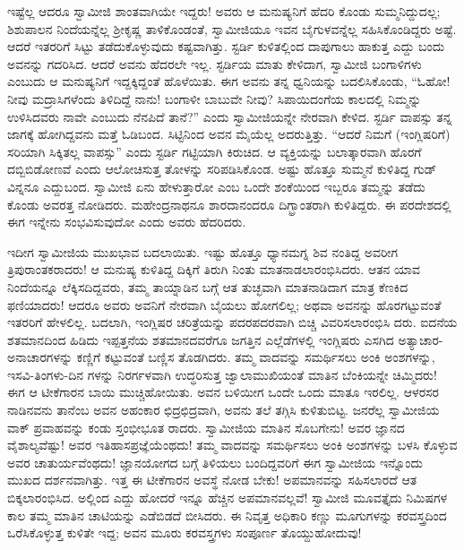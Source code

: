 ಇಷ್ಟೆಲ್ಲ ಆದರೂ ಸ್ವಾಮೀಜಿ ಶಾಂತವಾಗಿಯೇ ಇದ್ದರು! ಅವರು ಆ ಮನುಷ್ಯನಿಗೆ ಹೆದರಿ ಕೊಂಡು ಸುಮ್ಮನಿದ್ದುದಲ್ಲ; ಶಿಶುಪಾಲನ ನಿಂದೆಯನ್ನೆಲ್ಲ ಶ್ರೀಕೃಷ್ಣ ತಾಳಿಕೊಂಡಂತೆ, ಸ್ವಾಮೀಜಿಯೂ ಇವನ ಬೈಗುಳವನ್ನೆಲ್ಲ ಸಹಿಸಿಕೊಂಡಿದ್ದರು ಅಷ್ಟೆ. ಆದರೆ ಇತರರಿಗೆ ಸಿಟ್ಟು ತಡೆದುಕೊಳ್ಳುವುದು ಕಷ್ಟವಾಗಿತ್ತು. ಸ್ಟರ್ಡಿ ಕುಳಿತಲ್ಲಿಂದ ದಾಪುಗಾಲು ಹಾಕುತ್ತ ಎದ್ದು ಬಂದು ಅವನನ್ನು ಗದರಿಸಿದ. ಆದರೆ ಅವನು ಹೆದರಲೇ ಇಲ್ಲ. ಸ್ಟರ್ಡಿಯ ಮಾತು ಕೇಳಿದಾಗ, ಸ್ವಾಮೀಜಿ ಬಂಗಾಳಿಗಳು ಎಂಬುದು ಆ ಮನುಷ್ಯನಿಗೆ ಇದ್ದಕ್ಕಿದ್ದಂತೆ ಹೊಳೆಯಿತು. ಈಗ ಅವನು ತನ್ನ ಧ್ವನಿಯನ್ನು ಬದಲಿಸಿಕೊಂಡು, “ಓಹೋ! ನೀವು ಮದ್ರಾಸಿಗಳೆಂದು ತಿಳಿದಿದ್ದೆ ನಾನು! ಬಂಗಾಳೀ ಬಾಬುವೇ ನೀವು? ಸಿಪಾಯಿದಂಗೆಯ ಕಾಲದಲ್ಲಿ ನಿಮ್ಮನ್ನು ಉಳಿಸಿದವರು ನಾವೇ ಎಂಬುದು ನೆನಪಿದೆ ತಾನೆ?” ಎಂದು ಸ್ವಾಮೀಜಿಯನ್ನೇ ನೇರವಾಗಿ ಕೇಳಿದ. ಸ್ಟರ್ಡಿ ವಾಪಸ್ಸು ತನ್ನ ಜಾಗಕ್ಕೆ ಹೋಗಿದ್ದವನು ಮತ್ತೆ ಓಡಿಬಂದ. ಸಿಟ್ಟಿನಿಂದ ಅವನ ಮೈಯೆಲ್ಲ ಅದರುತ್ತಿತ್ತು. “ಆದರೆ ನಿಮಗೆ (ಇಂಗ್ಲಿಷರಿಗೆ) ಸರಿಯಾಗಿ ಸಿಕ್ಕಿತಲ್ಲ ವಾಪಸ್ಸು” ಎಂದು ಸ್ಟರ್ಡಿ ಗಟ್ಟಿಯಾಗಿ ಕಿರುಚಿದ. ಆ ವ್ಯಕ್ತಿಯನ್ನು ಬಲಾತ್ಕಾರವಾಗಿ ಹೊರಗೆ ದಬ್ಬಿಬಿಡೋಣವೆ ಎಂದು ಆಲೋಚಿಸುತ್ತ ತೋಳನ್ನು ಸರಿಪಡಿಸಿಕೊಂಡ. ಅಷ್ಟು ಹೊತ್ತೂ ಸುಮ್ಮನೆ ಕುಳಿತಿದ್ದ ಗುಡ್​ವಿನ್ನನೂ ಎದ್ದುಬಂದ. ಸ್ವಾಮೀಜಿ ಏನು ಹೇಳುತ್ತಾರೋ ಎಂಬ ಒಂದೇ ಶಂಕೆಯಿಂದ ಇಬ್ಬರೂ ತಮ್ಮನ್ನು ತಡೆದು ಕೊಂಡು ಅವರತ್ತ ನೋಡಿದರು. ಮಹೇಂದ್ರನಾಥನೂ ಶಾರದಾನಂದರೂ ದಿಗ್ಭ್ರಾಂತರಾಗಿ ಕುಳಿತಿದ್ದರು. ಈ ಪರದೇಶದಲ್ಲಿ ಈಗ ಇನ್ನೇನು ಸಂಭವಿಸುವುದೋ ಎಂದು ಅವರು ಹೆದರಿದರು.

ಇದೀಗ ಸ್ವಾಮೀಜಿಯ ಮುಖಭಾವ ಬದಲಾಯಿತು. ಇಷ್ಟು ಹೊತ್ತೂ ಧ್ಯಾನಮಗ್ನ ಶಿವ ನಂತಿದ್ದ ಅವರೀಗ ತ್ರಿಪುರಾಂತಕರಾದರು! ಆ ಮನುಷ್ಯ ಕುಳಿತಿದ್ದ ದಿಕ್ಕಿಗೆ ತಿರುಗಿ ನಿಂತು ಮಾತನಾಡಲಾರಂಭಿಸಿದರು. ಆತನ ಯಾವ ನಿಂದೆಯನ್ನೂ ಲೆಕ್ಕಿಸದಿದ್ದವರು, ತಮ್ಮ ತಾಯ್ನಾಡಿನ ಬಗ್ಗೆ ಆತ ತುಚ್ಛವಾಗಿ ಮಾತನಾಡಿದಾಗ ಮಾತ್ರ ಕೆಣಕಿದ ಫಣಿಯಾದರು! ಆದರೂ ಅವರು ಅವನಿಗೆ ನೇರವಾಗಿ ಬೈಯಲು ಹೋಗಲಿಲ್ಲ; ಅಥವಾ ಅವನನ್ನು ಹೊರಗಟ್ಟುವಂತೆ ಇತರರಿಗೆ ಹೇಳಲಿಲ್ಲ. ಬದಲಾಗಿ, ಇಂಗ್ಲಿಷರ ಚರಿತ್ರೆಯನ್ನು ಪದರಪದರವಾಗಿ ಬಿಚ್ಚಿ ವಿವರಿಸಲಾರಂಭಿಸಿ ದರು. ಐದನೆಯ ಶತಮಾನದಿಂದ ಹಿಡಿದು ಇಪ್ಪತ್ತನೆಯ ಶತಮಾನದವರೆಗೂ ಜಗತ್ತಿನ ಎಲ್ಲೆಡೆಗಳಲ್ಲಿ ಇಂಗ್ಲಿಷರು ಎಸಗಿದ ಅತ್ಯಾಚಾರ-ಅನಾಚಾರಗಳನ್ನು ಕಣ್ಣಿಗೆ ಕಟ್ಟುವಂತೆ ಬಣ್ಣಿಸ ತೊಡಗಿದರು. ತಮ್ಮ ವಾದವನ್ನು ಸಮರ್ಥಿಸಲು ಅಂಕಿ ಅಂಶಗಳನ್ನು, ಇಸವಿ-ತಿಂಗಳು-ದಿನ ಗಳನ್ನು ನಿರರ್ಗಳವಾಗಿ ಉದ್ಧರಿಸುತ್ತ ಜ್ವಾಲಾಮುಖಿಯಂತೆ ಮಾತಿನ ಬೆಂಕಿಯನ್ನೇ ಚಿಮ್ಮಿದರು! ಈಗ ಆ ಟೀಕೆಗಾರನ ಬಾಯಿ ಮುಚ್ಚಿಹೋಯಿತು. ಅವನ ಬಳಿಯೀಗ ಒಂದೇ ಒಂದು ಮಾತೂ ಇರಲಿಲ್ಲ. ಆಳರಸರ ನಾಡಿನವನು ತಾನೆಂಬ ಅವನ ಅಹಂಕಾರ ಛಿದ್ರಛಿದ್ರವಾಗಿ, ಅವನು ತಲೆ ತಗ್ಗಿಸಿ ಕುಳಿತುಬಿಟ್ಟ. ಜನರೆಲ್ಲ ಸ್ವಾಮೀಜಿಯ ವಾಕ್ ಪ್ರವಾಹವನ್ನು ಕಂಡು ಸ್ತಂಭೀಭೂತ ರಾದರು. ಸ್ವಾಮೀಜಿಯ ಮಾತಿನ ಸೊಬಗೇನು! ಅವರ ಜ್ಞಾನದ ವೈಶಾಲ್ಯವೆಷ್ಟು! ಅವರ ಇತಿಹಾಸಪ್ರಜ್ಞೆಯೆಂಥದು! ತಮ್ಮ ವಾದವನ್ನು ಸಮರ್ಥಿಸಲು ಅಂಕಿ ಅಂಶಗಳನ್ನು ಬಳಸಿ ಕೊಳ್ಳುವ ಅವರ ಚಾತುರ್ಯವೆಂಥದು! ಜ್ಞಾನಯೋಗದ ಬಗ್ಗೆ ತಿಳಿಯಲು ಬಂದಿದ್ದವರಿಗೆ ಈಗ ಸ್ವಾಮೀಜಿಯ ಇನ್ನೊಂದು ಮುಖದ ದರ್ಶನವಾಗಿತ್ತು. ಇತ್ತ ಈ ಟೀಕೆಗಾರನ ಅವಸ್ಥೆ ನೋಡ ಬೇಕು! ಅಪಮಾನವನ್ನು ಸಹಿಸಲಾರದೆ ಆತ ಬಿಕ್ಕಲಾರಂಭಿಸಿದ. ಅಲ್ಲಿಂದ ಎದ್ದು ಹೋದರೆ ಇನ್ನೂ ಹೆಚ್ಚಿನ ಅಪಮಾನವಲ್ಲವೆ! ಸ್ವಾಮೀಜಿ ಮೂವತ್ತೈದು ನಿಮಿಷಗಳ ಕಾಲ ತಮ್ಮ ಮಾತಿನ ಚಾಟಿಯನ್ನು ಎಡೆಬಿಡದೆ ಬೀಸಿದರು. ಈ ನಿವೃತ್ತ ಅಧಿಕಾರಿ ಕಣ್ಣು ಮೂಗುಗಳನ್ನು ಕರವಸ್ತ್ರದಿಂದ ಒರೆಸಿಕೊಳ್ಳುತ್ತ ಕುಳಿತೇ ಇದ್ದ; ಅವನ ಮೂರು ಕರವಸ್ತ್ರಗಳು ಸಂಪೂರ್ಣ ತೊಯ್ದುಹೋದುವು!

